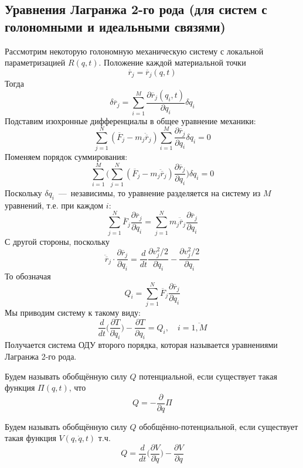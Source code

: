 \subsection{Уравнения Лагранжа 2-го рода (для систем с голономными и идеальными связями)}
\begin{definition}
    Рассмотрим некоторую голономную механическую систему с локальной параметризацией $R(q, t)$. Положение каждой материальной точки \[
        \overline{r}_j = \overline{r}_j(q, t)
    \]
    Тогда \[\delta \overline{r}_j = \sum\limits_{i = 1}^M \dfrac{\partial \overline{r}_j(q_i, t)}{\partial q_i}\delta q_i\]
    Подставим изохронные дифференциалы в общее уравнение механики: \[\sum\limits_{j = 1}^N (\overline{F}_j - m_j\ddot{\overline{r}}_j)\sum\limits_{i = 1}^M \dfrac{\partial \overline{r}_j}{\partial q_i}\delta q_i = 0\]
    Поменяем порядок суммирования: \[\sum\limits_{i = 1}^M \biggr( \sum\limits_{j = 1}^N (\overline{F}_j - m_j\ddot{\overline{r}}_j)\dfrac{\partial \overline{r}_j}{\partial q_i}\biggr)\delta q_i = 0\]
    Поскольку $\delta q_i$~---~независимы, то уравнение разделяется на систему из $M$ уравнений, т.е. при каждом $i$: \[
    \sum\limits_{j = 1}^N \overline{F}_j \dfrac{\partial \overline{r}_j}{\partial q_i} = \sum\limits_{j = 1}^N m_j \ddot{\overline{r}}_j\dfrac{\partial \overline{r}_j}{\partial q_i}
    \]
    С другой стороны, поскольку \[\ddot{\overline{r}}_j \cdot \dfrac{\partial \overline{r}_j}{\partial q_i} = \dfrac{d}{dt}\dfrac{\partial v_j^2/2}{\partial \dot{q}_i} - \dfrac{\partial v_j^2/2}{\partial q_i}\]
    То обозначая \[Q_i = \sum\limits_{j = 1}^N \overline{F}_j\dfrac{\partial \overline{r}_j}{\partial q_i}\]
    Мы приводим систему к такому виду: \[\dfrac{d}{dt}\biggr(\dfrac{\partial T}{\partial \dot{q}_i}\biggr) - \dfrac{\partial T}{\partial q_i} = Q_i, \quad i = \overline{1, M}\]
    Получается система ОДУ второго порядка, которая называется уравнениями Лагранжа 2-го рода.
\end{definition}
\begin{definition}
    Будем называть обобщённую силу $Q$ потенциальной, если существует такая функция $\Pi(q, t)$, что \[Q = -\dfrac{\partial}{\partial q}\Pi\]
\end{definition}
\begin{definition}
    Будем называть обобщённую силу $Q$ обобщённо-потенциальной, если существует такая функция $V(q, \dot{q}, t)$ т.ч. \[
        Q = \dfrac{d}{dt}\biggr(\dfrac{\partial V}{\partial \dot{q}}\biggr) - \dfrac{\partial V}{\partial q}
    \]
\end{definition}
